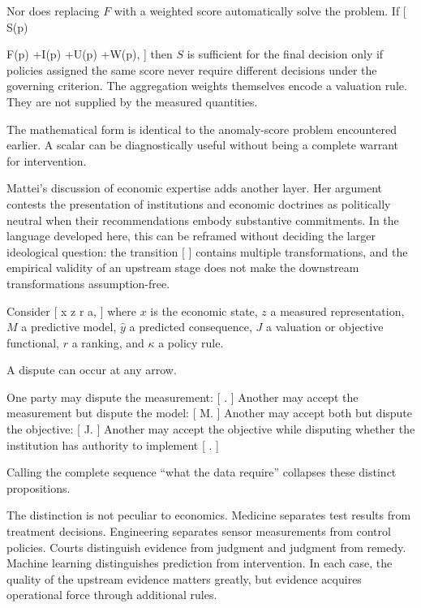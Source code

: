 \documentclass[11pt]{article}
\begin{document}
Nor does replacing $F$ with a weighted score automatically solve the problem. If
[
S(p)

\alpha F(p)
+\beta I(p)
+\gamma U(p)
+\delta W(p),
]
then $S$ is sufficient for the final decision only if policies assigned the same score never require different decisions under the governing criterion. The aggregation weights themselves encode a valuation rule. They are not supplied by the measured quantities.

The mathematical form is identical to the anomaly-score problem encountered earlier. A scalar can be diagnostically useful without being a complete warrant for intervention.

Mattei's discussion of economic expertise adds another layer. Her argument contests the presentation of institutions and economic doctrines as politically neutral when their recommendations embody substantive commitments. In the language developed here, this can be reframed without deciding the larger ideological question: the transition
[
\rightarrow
{}
\rightarrow
{}
\rightarrow
{}
]
contains multiple transformations, and the empirical validity of an upstream stage does not make the downstream transformations assumption-free.

Consider
[
x
\xrightarrow{\pi}
z
r
\xrightarrow{\kappa}
a,
]
where $x$ is the economic state, $z$ a measured representation, $M$ a predictive model, $\widehat{y}$ a predicted consequence, $J$ a valuation or objective functional, $r$ a ranking, and $\kappa$ a policy rule.

A dispute can occur at any arrow.

One party may dispute the measurement:
[
\pi.
]
Another may accept the measurement but dispute the model:
[
M.
]
Another may accept both but dispute the objective:
[
J.
]
Another may accept the objective while disputing whether the institution has authority to implement
[
\kappa.
]

Calling the complete sequence ``what the data require'' collapses these distinct propositions.

The distinction is not peculiar to economics. Medicine separates test results from treatment decisions. Engineering separates sensor measurements from control policies. Courts distinguish evidence from judgment and judgment from remedy. Machine learning distinguishes prediction from intervention. In each case, the quality of the upstream evidence matters greatly, but evidence acquires operational force through additional rules.
\end{document}
